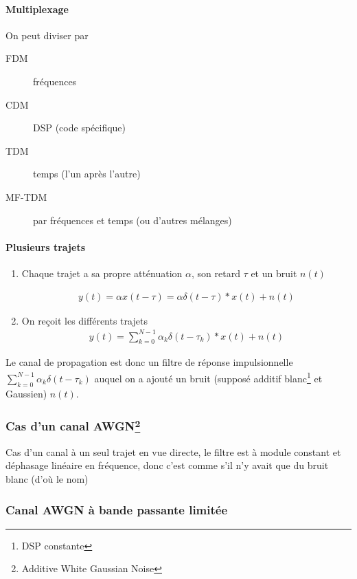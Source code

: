 \documentclass{article}
\begin{document}
\paragraph{Multiplexage}
On peut diviser par
\begin{description}
	\item[FDM] fréquences
	\item[CDM] DSP (code spécifique)
	\item[TDM] temps (l'un après l'autre)
	\item[MF-TDM] par fréquences et temps (ou d'autres mélanges)
\end{description}

\paragraph{Plusieurs trajets}

\begin{enumerate}
	\item Chaque trajet a sa propre atténuation $\alpha$, son retard $\tau$ et un bruit $n(t)$

		 \begin{align*}
			y(t) = \alpha x(t-\tau) = \alpha \delta(t-\tau) \ast x(t) + n(t)
		\end{align*}
	\item On reçoit les différents trajets
		\begin{align*}
			y(t) = \sum_{k=0}^{N-1} \alpha_k \delta(t-\tau_k) \ast x(t) + n(t)
		\end{align*}
\end{enumerate}

Le canal de propagation est donc un filtre de réponse impulsionnelle $\sum_{k=0}^{N-1}  \alpha_k \delta(t-\tau_k)$ auquel on a ajouté un bruit (supposé additif blanc\footnote{DSP constante} et Gaussien) $n(t)$.

\subsubsection{Cas d'un canal AWGN\footnote{Additive White Gaussian Noise}}

Cas d'un canal à un seul trajet en vue directe, le filtre est à module constant et déphasage linéaire en fréquence, donc c'est comme s'il n'y avait que du bruit blanc  (d'où le nom)

\subsubsection{Canal AWGN à bande passante limitée}
\end{document}
